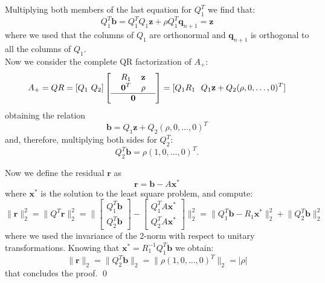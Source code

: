 \documentclass[a4paper,11pt]{article}
\begin{document}
Multiplying both members of the last equation for $Q_1^T$ we find that:
\begin{equation}\label{key}
	Q_1^T \textbf{b} = Q_1^T Q_1 \textbf{z} +  \rho Q_1^T \textbf{q}_{n+1} = \textbf{z}
\end{equation}
where we used that the columns of $Q_1$ are orthonormal and $\textbf{q}_{n+1}$ is orthogonal to all the columns of $Q_1$.\\
Now we consider the complete QR factorization of $A_+$:
\begin{equation}
	A_+ =QR= [Q_1\ Q_2] \left[ \begin{tabular}{c}
		\begin{tabular}{cc}
			$R_1$& $\textbf{z}$ \\
			$\textbf{0}^T$& $\rho$ \\
		\end{tabular}\\
	\hline
		$\textbf{0}$
	\end{tabular}\right] = [Q_1 R_1\ \ Q_1 \textbf{z} + Q_2(\rho,0,\dots,0)^T  ]
\end{equation}
obtaining the relation
\begin{equation}\label{key}
	\textbf{b} = Q_1 \textbf{z} + Q_2(\rho,0,\dots,0)^T
\end{equation}
and, therefore, multiplying both sides for $Q_2^T$:
\begin{equation}\label{key}
	Q_2^T \textbf{b} = \rho (1,0,\dots,0)^T.
\end{equation}

\noindent Now we define the residual $\textbf{r}$ as
\begin{equation}\label{key}
	\textbf{r} = \textbf{b} - A \textbf{x}^*
\end{equation}
where $ \textbf{x}^*$ is the solution to the least square problem, and compute:
\begin{equation}\label{key}
	\lVert \textbf{r} \rVert_2^2 = \lVert Q^T \textbf{r} \rVert_2^2 = \lVert \begin{bmatrix}
		Q_1^T \textbf{b}\\
		Q_2^T \textbf{b}
	\end{bmatrix} -\begin{bmatrix}
		Q_1^T A \textbf{x}^*\\
		Q_2^T A \textbf{x}^*
	\end{bmatrix} \rVert_2^2 = \lVert Q_1^T \textbf{b} - R_1 \textbf{x}^* \rVert_2^2 + \lVert Q_2^T \textbf{b} \rVert_2^2
\end{equation}
where we used the invariance of the 2-norm with respect to unitary transformations. Knowing that $\textbf{x}^* = R_1^{-1} Q_1^T \textbf{b}$ we obtain:
\begin{equation}\label{key}
	\lVert \textbf{r} \rVert_2 = \lVert Q_2^T \textbf{b} \rVert_2 = \lVert \rho (1,0,\dots,0)^T \rVert_2 = |\rho|
\end{equation}
that concludes the proof. \qed
\end{document}
